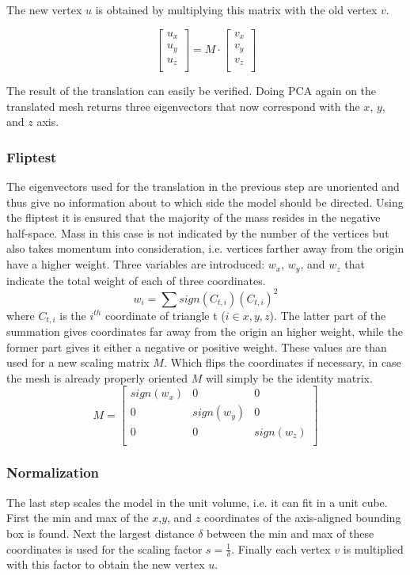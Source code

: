 \documentclass{bigdata}
\begin{document}
The new vertex $u$ is obtained by multiplying this matrix with the old vertex $v$.

\[
\begin{bmatrix}
u_x \\
u_y \\
u_z \\
\end{bmatrix}
=
M
\cdot
\begin{bmatrix}
v_x \\
v_y \\
v_z \\
\end{bmatrix}
\]

The result of the translation can easily be verified. Doing PCA again on the translated mesh returns three eigenvectors that now correspond with the $x$, $y$, and $z$ axis.

\subsubsection{Fliptest}
The eigenvectors used for the translation in the previous step are unoriented and thus give no information about to which side the model should be directed. Using the fliptest it is ensured that the majority of the mass resides in the negative half-space. Mass in this case is not indicated by the number of the vertices but also takes momentum into consideration, i.e. vertices farther away from the origin have a higher weight. Three variables are introduced: $w_x$, $w_y$, and $w_z$ that indicate the total weight of each of three coordinates. 
\begin{equation}
w_i = \sum sign(C_{t,i})(C_{t,i})^2
\end{equation}
 where $C_{t,i}$ is the $i^{th}$ coordinate of triangle t ($i \in {x,y,z}$). The latter part of the summation gives coordinates far away from the origin an higher weight, while the former part gives it either a negative or positive weight. These values are than used for a new scaling matrix $M$. Which flips the coordinates if necessary, in case the mesh is already properly oriented $M$ will simply be the identity matrix.
\[
M = 
\begin{bmatrix}
sign(w_x) & 0 & 0 \\
0 & sign(w_y) & 0 \\
0 & 0 & sign(w_z) \\
\end{bmatrix}
\]

\subsubsection{Normalization}
The last step scales the model in the unit volume, i.e. it can fit in a unit cube. First the min and max of the $x$,$y$, and $z$ coordinates of the axis-aligned bounding box is found. Next the largest distance $\delta$ between the min and max of these coordinates is used for the scaling factor $s = \frac{1}{\delta}$. Finally each vertex $v$ is multiplied with this factor to obtain the new vertex $u$.
\end{document}
